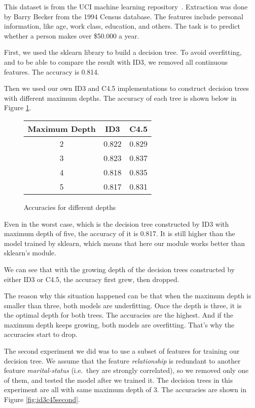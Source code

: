 \documentclass[a4paper]{article}
\begin{document}
This dataset is from the UCI machine learning repository~\cite{census}. Extraction was done by Barry Becker from the 1994 Census database. The features include personal information, like age, work class, education, and others. The task is to predict whether a person makes over \$50.000 a year.

First, we used the sklearn library to build a decision tree. To avoid overfitting, and to be able to compare the result with ID3, we removed all continuous features. The accuracy is 0.814.

Then we used our own ID3 and C4.5 implementations to construct decision trees with different maximum depths. The accuracy of each tree is shown below in Figure \ref{fig:id3c45all}.
\begin{figure}[h]
	\centering
     \begin{tabular}{c|c|c}
       \textbf{Maximum Depth} & \textbf{ID3} & \textbf{C4.5} \\
       \hline
       2 & 0.822 & 0.829 \\
       3 & 0.823 & 0.837 \\
       4 & 0.818 & 0.835 \\
       5 & 0.817 & 0.831
     \end{tabular}
     \caption{Accuracies for different depths}
     \label{fig:id3c45all}
\end{figure}

Even in the worst case, which is the decision tree constructed by ID3 with maximum depth of five, the accuracy of it is 0.817. It is still higher than the model trained by sklearn, which means that here our module works better than sklearn's module.

We can see that with the growing depth of the decision trees constructed by either ID3 or C4.5, the accuracy first grew, then dropped.

The reason why this situation happened can be that when the maximum depth is smaller than three, both models are underfitting. Once the depth is three, it is the optimal depth for both trees. The accuracies are the highest. And if the maximum depth keeps growing, both models are overfitting. That's why the accuracies start to drop.

The second experiment we did was to use a subset of features for training our decision tree. We assume that the feature \emph{relationship} is redundant to another feature \emph{marital-status} (i.e.\ they are strongly correlated), so we removed only one of them, and tested the model after we trained it. The decision trees in this experiment are all with same maximum depth of 3. The accuracies are shown in Figure \ref{fig:id3c45second}.
\end{document}
